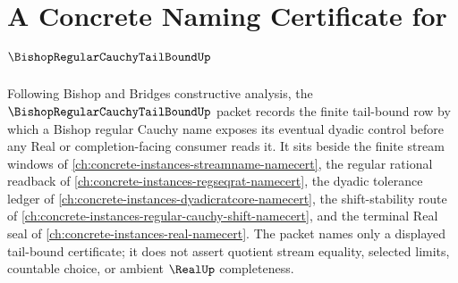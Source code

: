 \chapter{A Concrete Naming Certificate for $\BishopRegularCauchyTailBoundUp$}
\label{ch:concrete-instances-bishop-regular-cauchy-tail-bound-namecert}

Following Bishop and Bridges constructive analysis, the $\BishopRegularCauchyTailBoundUp$ packet records the finite tail-bound row by which a Bishop regular Cauchy name exposes its eventual dyadic control before any Real or completion-facing consumer reads it. It sits beside the finite stream windows of \autoref{ch:concrete-instances-streamname-namecert}, the regular rational readback of \autoref{ch:concrete-instances-regseqrat-namecert}, the dyadic tolerance ledger of \autoref{ch:concrete-instances-dyadicratcore-namecert}, the shift-stability route of \autoref{ch:concrete-instances-regular-cauchy-shift-namecert}, and the terminal Real seal of \autoref{ch:concrete-instances-real-namecert}. The packet names only a displayed tail-bound certificate; it does not assert quotient stream equality, selected limits, countable choice, or ambient $\RealUp$ completeness.


